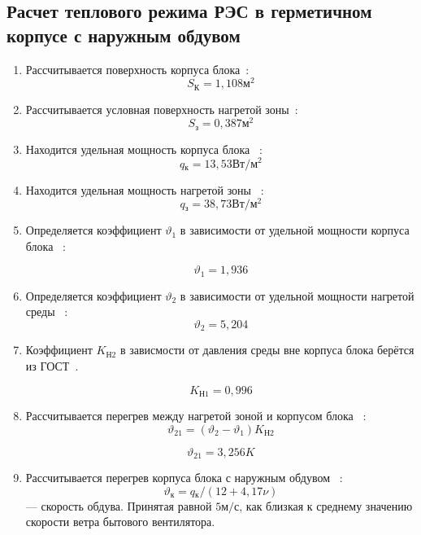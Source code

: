 \subsection{Расчет теплового режима РЭС в герметичном корпусе с наружным обдувом}

\begin{enumerate}[label={\arabic*.}]
\item Рассчитывается поверхность корпуса блока~\cite{Rotkop1976}: %
  $$S\mathrm{_{К}}=1,108\mathrm{м^2}$$

\item Рассчитывается условная поверхность нагретой зоны~\cite{Rotkop1976}: %
  $$S\mathrm{_{з}} = 0,387\mathrm{м^2}$$ 
\item Находится удельная мощность корпуса блока ~\cite{Rotkop1976}:  %
  $$q\mathrm{_к} = 13,53\mathrm{Вт/м^2}$$

\item Находится удельная мощность нагретой зоны ~\cite{Rotkop1976}: %
  $$q\mathrm{_з} = 38,73 \mathrm{ Вт/м^2}$$

\item Определяется коэффициент $\vartheta_1$ в зависимости от удельной мощности корпуса блока ~\cite{Rotkop1976}:

  $$\vartheta_1=1,936$$
\item Определяется коэффициент $\vartheta_2$ в зависимости от удельной мощности нагретой среды ~\cite{Rotkop1976}:
  $$\vartheta_2=5,204$$
  

\item Коэффициент $K\mathrm{_{Н2}}$ в зависмости от давления
  среды вне корпуса блока берётся из ГОСТ~\cite{GOST_15150-69}.

  $$K\mathrm{_{Н1}} = 0,996$$

\item Рассчитывается перегрев между нагретой зоной и корпусом блока
  ~\cite{Rotkop1976}:
  \begin{equation}
    \vartheta_{21} = (\vartheta_{2}-\vartheta_{1})K\mathrm{_{Н2}}
    \end{equation}

    $$\vartheta_{21}=3,256 K$$

\item Рассчитывается перегрев корпуса блока с наружным обдувом
    ~\cite{Rotkop1976}:
    \begin{equation}
      \vartheta\mathrm{_к} = q\mathrm{_к}/(12 + 4,17 \nu)
      \end{equation}
      \nu — скорость обдува. Принятая равной $5\mathrm{м/с}$,
      как близкая к среднему значению скорости ветра бытового
вентилятора.


\end{enumerate}
